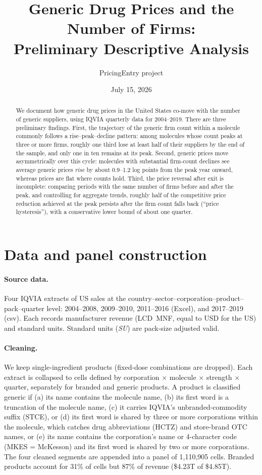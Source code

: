 \documentclass[11pt]{article}
\title{Generic Drug Prices and the Number of Firms:\\
Preliminary Descriptive Analysis}
\author{PricingEntry project}
\date{July 15, 2026}
\newcommand{\su}{\textit{SU}}
\begin{document}
\maketitle

\begin{abstract}
\noindent We document how generic drug prices in the United States co-move
with the number of generic suppliers, using IQVIA quarterly data for
2004--2019. There are three preliminary findings. First, the trajectory of the generic firm count
within a molecule commonly follows a rise--peak--decline pattern: among
molecules whose count peaks at three or more firms, roughly one third lose at
least half of their suppliers by the end of the sample, and only one in ten
remains at its peak. Second, generic prices move asymmetrically over this
cycle: molecules with substantial firm-count declines see average generic
prices \emph{rise} by about 0.9--1.2 log points from the peak year onward,
whereas prices are flat where counts hold. Third, the price reversal after
exit is incomplete: comparing periods with the same number of firms before
and after the peak, and controlling for aggregate trends, roughly half of
the competitive price reduction achieved at the peak persists after the firm
count falls back (``price hysteresis''), with a conservative lower bound of
about one quarter.
\end{abstract}

\section{Data and panel construction}

\paragraph{Source data.} Four IQVIA extracts of US sales at the
country--sector--corporation--product--pack--quarter level: 2004--2008,
2009--2010, 2011--2016 (Excel), and 2017--2019 (csv). Each records
manufacturer revenue (LCD~MNF, equal to USD for the US) and standard units.
Standard units (\su) are pack-size adjusted 
valid.

\paragraph{Cleaning.} We keep single-ingredient products (fixed-dose
combinations are dropped). Each extract is collapsed to cells defined
by corporation $\times$ molecule $\times$ strength $\times$ quarter,
separately for branded and generic products. A product is classified generic
if (a) its name contains the molecule name, (b) its first word is a
truncation of the molecule name, (c) it carries IQVIA's
unbranded-commodity suffix (STCE), or (d) its first word is shared by three
or more corporations within the molecule, which catches drug abbreviations
(HCTZ) and store-brand OTC names, or (e) its name contains the
corporation's name or 4-character code (MKES = McKesson) and its first word
is shared by two or more corporations.
The four cleaned segments are appended into a panel of 1{,}110{,}905 cells.
Branded products account for 31\% of cells but 87\% of revenue (\$4.23T of
\$4.85T).
\end{document}
